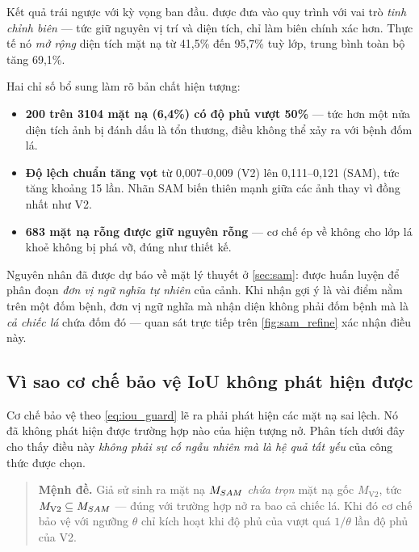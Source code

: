 Kết quả trái ngược với kỳ vọng ban đầu. \SAM{} được đưa vào quy trình với vai trò
\emph{tinh chỉnh biên} --- tức giữ nguyên vị trí và diện tích, chỉ làm biên chính
xác hơn. Thực tế nó \emph{mở rộng} diện tích mặt nạ từ 41,5\% đến 95,7\% tuỳ lớp,
trung bình toàn bộ tăng 69,1\%.

Hai chỉ số bổ sung làm rõ bản chất hiện tượng:

\begin{itemize}
    \item \textbf{200 trên \num{3104} mặt nạ (6,4\%) có độ phủ vượt 50\%} --- tức
          hơn một nửa diện tích ảnh bị đánh dấu là tổn thương, điều không thể xảy
          ra với bệnh đốm lá.
    \item \textbf{Độ lệch chuẩn tăng vọt} từ 0,007--0,009 (V2) lên 0,111--0,121
          (SAM), tức tăng khoảng 15 lần. Nhãn SAM biến thiên mạnh giữa các ảnh
          thay vì đồng nhất như V2.
    \item \textbf{683 mặt nạ rỗng được giữ nguyên rỗng} --- cơ chế ép về không cho
          lớp lá khoẻ không bị \SAM{} phá vỡ, đúng như thiết kế.
\end{itemize}

Nguyên nhân đã được dự báo về mặt lý thuyết ở \cref{sec:sam}: \SAM{} được huấn
luyện để phân đoạn \emph{đơn vị ngữ nghĩa tự nhiên} của cảnh. Khi nhận gợi ý là
vài điểm nằm trên một đốm bệnh, đơn vị ngữ nghĩa mà \SAM{} nhận diện không phải
đốm bệnh mà là \emph{cả chiếc lá} chứa đốm đó --- quan sát trực tiếp trên
\cref{fig:sam_refine} xác nhận điều này.

\subsection{Vì sao cơ chế bảo vệ IoU không phát hiện được}
\label{subsec:iouguard}

Cơ chế bảo vệ theo \cref{eq:iou_guard} lẽ ra phải phát hiện các mặt nạ sai lệch.
Nó đã không phát hiện được trường hợp nào của hiện tượng nở. Phân tích dưới đây
cho thấy điều này \emph{không phải sự cố ngẫu nhiên mà là hệ quả tất yếu} của công
thức được chọn.

\begin{quote}
\textbf{Mệnh đề.} Giả sử \SAM{} sinh ra mặt nạ $M_{SAM}$ \emph{chứa trọn} mặt nạ
gốc $M_{\text{V2}}$, tức $M_{\text{V2}} \subseteq M_{SAM}$ --- đúng với trường hợp
nở ra bao cả chiếc lá. Khi đó cơ chế bảo vệ với ngưỡng $\theta$ chỉ kích hoạt khi
độ phủ của \SAM{} vượt quá $1/\theta$ lần độ phủ của V2.
\end{quote}

